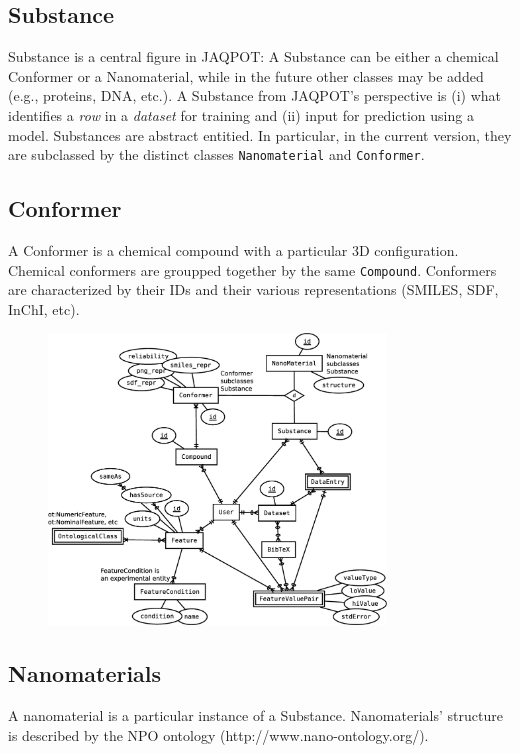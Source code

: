 \subsection{Substance}
Substance is a central figure in JAQPOT: A Substance can be either a
chemical Conformer or a Nanomaterial, while in the future other classes
may be added (e.g., proteins, DNA, etc.). A Substance from JAQPOT's
perspective is (i) what identifies a \textit{row} in a \textit{dataset} for
training and (ii) input for prediction using a model.
Substances are abstract entitied. In particular, in the current version, they
are subclassed by the distinct classes \texttt{Nanomaterial} and \texttt{Conformer}.

\subsection{Conformer}
A Conformer is a chemical compound with a particular 3D configuration.
Chemical conformers are groupped together by the same \texttt{Compound}.
Conformers are characterized by their IDs and their various representations
(SMILES, SDF, InChI, etc).

\begin{figure}[h]
 \centering
 \includegraphics[keepaspectratio=true,width=0.8\textwidth]{figures/chemical_data}
\end{figure}

\subsection{Nanomaterials}
A nanomaterial is a particular instance of a Substance. Nanomaterials'
structure is described by the NPO ontology (http://www.nano-ontology.org/).



